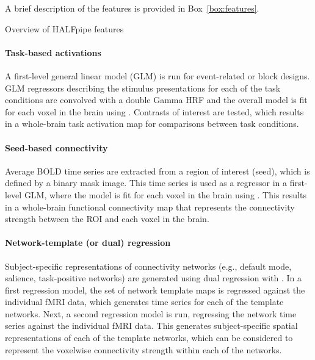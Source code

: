 A brief description of the features is provided in Box~\ref{box:features}.

\begin{featurebox}[label={box:features}]{Overview of HALFpipe features}

\paragraph{Task-based activations}

A first-level general linear model (GLM) is run for event-related or block
designs. GLM regressors describing the stimulus presentations for each of
the task conditions are convolved with a double Gamma HRF and the overall
model is fit for each voxel in the brain using 
\parencite{woolrich_temporal_2001}. Contrasts of interest are tested, which
results in a whole-brain task activation map for comparisons between task
conditions.

\paragraph{Seed-based connectivity}

Average BOLD time series are extracted from a region of interest (seed),
which is defined by a binary mask image. This time series is used as a
regressor in a first-level GLM, where the model is fit for each voxel in
the brain using . This results in a whole-brain functional
connectivity map that represents the connectivity strength between the ROI
and each voxel in the brain.

\paragraph{Network-template (or dual) regression}

Subject-specific representations of connectivity networks (e.g., default
mode, salience, task-positive networks) are generated using dual regression
\parencite{beckmann_dual_reg_2009} with . In a first
regression model, the set of network template maps is regressed against the
individual fMRI data, which generates time series for each of the template
networks. Next, a second regression model is run, regressing the network
time series against the individual fMRI data. This generates
subject-specific spatial representations of each of the template networks,
which can be considered to represent the voxelwise connectivity strength
within each of the networks.


\end{featurebox}
